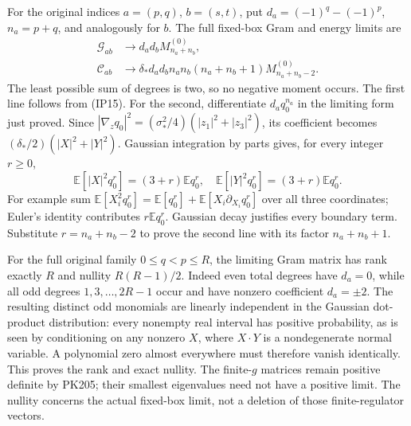 \documentclass[11pt]{article}
\begin{document}
For the original indices \(a=(p,q)\), \(b=(s,t)\), put
\(d_a=(-1)^q-(-1)^p\), \(n_a=p+q\), and analogously for \(b\).
The full fixed-box Gram and energy limits are
\[
\boxed{
\begin{aligned}
 \mathcal G_{ab}&\longrightarrow
   d_ad_b M^{(0)}_{n_a+n_b},\\
 \mathcal C_{ab}&\longrightarrow
 \delta_*d_ad_b n_an_b(n_a+n_b+1)M^{(0)}_{n_a+n_b-2}.
\end{aligned}}\tag{IP17}
\]
The least possible sum of degrees is two, so no negative moment occurs.
The first line follows from (IP15). For the second, differentiate
\(d_aq_0^{n_a}\) in the limiting form just proved. Since
\(|\nabla_zq_0|^2=(\sigma_*^2/4)(|z_1|^2+|z_3|^2)\), its coefficient
becomes \((\delta_*/2)(|X|^2+|Y|^2)\). Gaussian integration by parts
gives, for every integer \(r\ge0\),
\[
 \mathbb E[|X|^2q_0^r]=(3+r)\mathbb E q_0^r,
 \quad
 \mathbb E[|Y|^2q_0^r]=(3+r)\mathbb E q_0^r.
\]
For example sum
\(\mathbb E[X_i^2q_0^r]=\mathbb E[q_0^r]
+\mathbb E[X_i\partial_{X_i}q_0^r]\) over all three coordinates;
Euler's identity contributes \(r\mathbb E q_0^r\). Gaussian decay
justifies every boundary term. Substitute \(r=n_a+n_b-2\) to prove
the second line with its factor \(n_a+n_b+1\).

For the full original family \(0\le q<p\le R\), the limiting Gram
matrix has rank exactly \(R\) and nullity \(R(R-1)/2\).
Indeed even total degrees have \(d_a=0\), while all odd degrees
\(1,3,\ldots,2R-1\) occur and have nonzero coefficient \(d_a=\pm2\).
The resulting distinct odd monomials are linearly independent in the
Gaussian dot-product distribution: every nonempty real interval has
positive probability, as is seen by conditioning on any nonzero \(X\),
where \(X\cdot Y\) is a nondegenerate normal variable. A polynomial
zero almost everywhere must therefore vanish identically. This proves
the rank and exact nullity. The finite-\(g\) matrices remain positive
definite by PK205; their smallest eigenvalues need not have a positive
limit. The nullity concerns the actual fixed-box limit, not a deletion
of those finite-regulator vectors.
\end{document}

